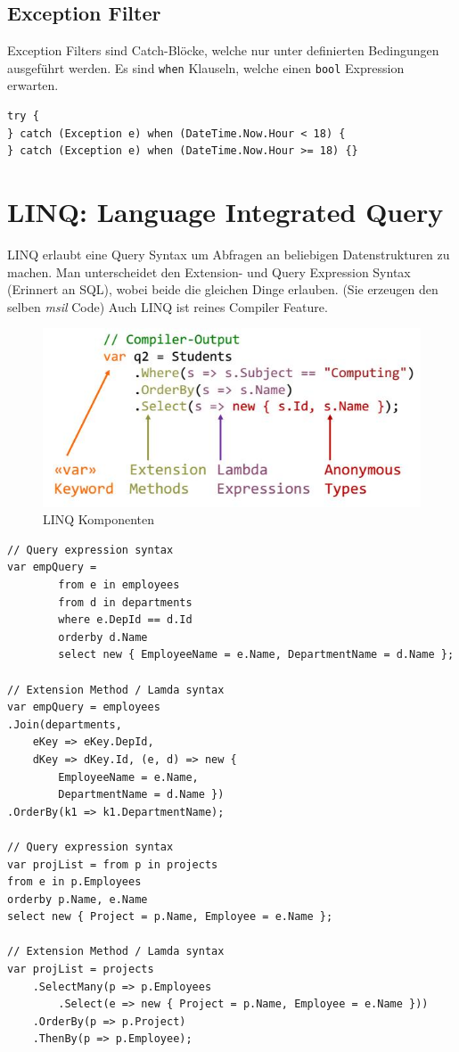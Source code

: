 \documentclass[
a4paper,
oneside,
10pt,
fleqn,
headsepline,
toc=listofnumbered, 
bibliography=totocnumbered]{scrartcl}
\let\stdsection\section
\renewcommand\section{\clearpage\stdsection}
\begin{document}
\subsection{Exception Filter}
Exception Filters sind Catch-Blöcke, welche nur unter definierten Bedingungen ausgeführt werden. Es sind \lstinline|when| Klauseln, welche einen \lstinline|bool| Expression erwarten.
\begin{lstlisting}
try {
} catch (Exception e) when (DateTime.Now.Hour < 18) {
} catch (Exception e) when (DateTime.Now.Hour >= 18) {}
\end{lstlisting}


\section{LINQ: Language Integrated Query}
LINQ erlaubt eine Query Syntax um Abfragen an beliebigen Datenstrukturen zu machen. Man unterscheidet den Extension- und Query Expression Syntax (Erinnert an SQL), wobei beide die gleichen Dinge erlauben. (Sie erzeugen den selben \textit{msil} Code) Auch LINQ ist reines Compiler Feature.

\begin{figure}[ht]
	\centering
	\includegraphics[width=0.7\linewidth]{images/linq_components}
	\caption{LINQ Komponenten}
	\label{fig:linqcomponents}
\end{figure}

\begin{lstlisting}
// Query expression syntax
var empQuery =
        from e in employees
        from d in departments
        where e.DepId == d.Id
        orderby d.Name
        select new { EmployeeName = e.Name, DepartmentName = d.Name };

// Extension Method / Lamda syntax
var empQuery = employees
.Join(departments, 
	eKey => eKey.DepId, 
	dKey => dKey.Id, (e, d) => new { 
		EmployeeName = e.Name, 
		DepartmentName = d.Name })
.OrderBy(k1 => k1.DepartmentName);

// Query expression syntax
var projList = from p in projects
from e in p.Employees
orderby p.Name, e.Name
select new { Project = p.Name, Employee = e.Name };

// Extension Method / Lamda syntax
var projList = projects
    .SelectMany(p => p.Employees
        .Select(e => new { Project = p.Name, Employee = e.Name }))
    .OrderBy(p => p.Project)
    .ThenBy(p => p.Employee);			  
\end{lstlisting}
\end{document}

